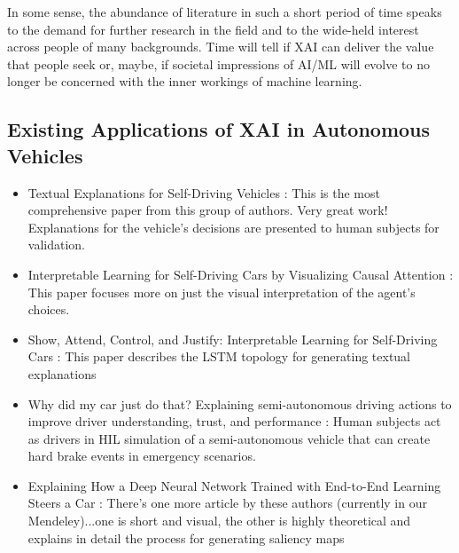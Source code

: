 In some sense, the abundance of literature in such a short period of time speaks to the demand for further research in the field and to the wide-held interest across people of many backgrounds.  Time will tell if XAI can deliver the value that people seek or, maybe, if societal impressions of AI/ML will evolve to no longer be concerned with the inner workings of machine learning.

\subsection{Existing Applications of XAI in Autonomous Vehicles}

\begin{itemize}
    \item Textual Explanations for Self-Driving Vehicles \cite{kim2018textual}: This is the most comprehensive paper from this group of authors.  Very great work!  Explanations for the vehicle's decisions are presented to human subjects for validation.

    \item Interpretable Learning for Self-Driving Cars by Visualizing Causal Attention \cite{Kim2017InterpretableLF}:  This paper focuses more on just the visual interpretation of the agent's choices.

    \item Show, Attend, Control, and Justify: Interpretable Learning for Self-Driving Cars \cite{Kim2017ShowA}: This paper describes the LSTM topology for generating textual explanations

    \item Why did my car just do that? Explaining semi-autonomous driving actions to improve driver understanding, trust, and performance \cite{Koo2015}:  Human subjects act as drivers in HIL simulation of a semi-autonomous vehicle that can create hard brake events in emergency scenarios.
    
    \item Explaining How a Deep Neural Network Trained with End-to-End Learning Steers a Car \cite{Bojarski2017ExplainingHA}: There's one more article by these authors (currently in our Mendeley)...one is short and visual, the other is highly theoretical and explains in detail the process for generating saliency maps
\end{itemize}
